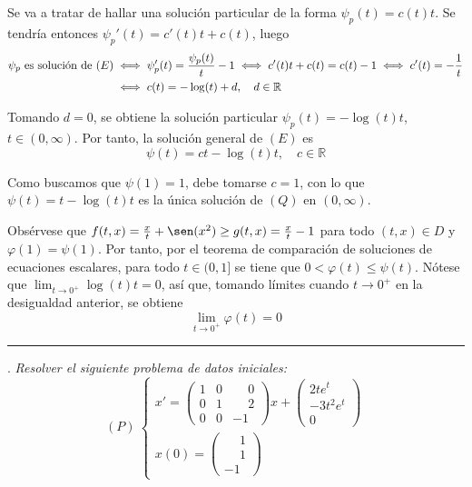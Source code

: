 \documentclass[11pt]{report}
\newcommand{\R}{\mathbb R}
\begin{document}
\vspace{2mm}

Se va a tratar de hallar una solución particular de la forma $\psi_p(t)=c(t)t$. Se tendría entonces $\psi_p'(t)=c'(t)t+c(t)$, luego
\[\begin{aligned}[t]
    \psi_p \textup{ es solución de } (E) &\iff \psi_p'(t)=\frac{\psi_p(t)}{t}-1 \iff c'(t)t+c(t)=c(t)-1 \iff c'(t)=-\frac{1}{t} \\
    &\iff c(t)=-\log(t)+d, \quad d \in \R
\end{aligned} \]

Tomando $d=0$, se obtiene la solución particular $\psi_p(t)=-\log(t)t$, $t \in (0,\infty)$. Por tanto, la solución general de $(E)$ es 
\[\psi(t)=ct-\log(t)t, \quad c\in \R\]

Como buscamos que $\psi(1)=1$, debe tomarse $c=1$, con lo que $\psi(t)=t-\log(t)t$ es la única solución de $(Q)$ en $(0,\infty)$.

\vspace{2mm}

Obsérvese que $f(t,x)=\frac{x}{t}+\sen(x^2) \geq g(t,x)=\frac{x}{t}-1$ para todo $(t,x) \in D$ y $\varphi(1)=\psi(1)$. Por tanto, por el teorema de comparación de soluciones de ecuaciones escalares, para todo $t \in (0,1]$ se tiene que $0 < \varphi(t) \leq \psi(t)$. Nótese que $\lim_{t \to 0^+}\log(t)t=0$, así que, tomando límites cuando $t \to 0^+$ en la desigualdad anterior, se obtiene
\[\lim_{t \to 0^+} \varphi(t)=0\]

\vspace{2mm}

\hrule

\vspace{4mm}

. \textit{Resolver el siguiente problema de datos iniciales:}
\[(P) \ \begin{cases}
    x'=\begin{pmatrix}
        1 & 0 & \phantom{-}0 \\
        0 & 1 & \phantom{-}2 \\
        0 & 0 & -1
    \end{pmatrix}x+\begin{pmatrix}
        2te^t \\
        -3t^2e^t \\
        0
    \end{pmatrix} \\
    x(0)=\begin{pmatrix}
        \phantom{-}1 \\
        \phantom{-}1 \\
        -1
    \end{pmatrix}
\end{cases}\]
\end{document}
